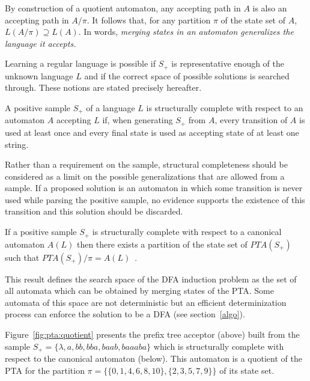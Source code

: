 By construction of a quotient automaton, any accepting path in $A$ is also an accepting path in $A/\pi$. It follows that, for any partition $\pi$ of the state set of $A$, $L(A/\pi) \supseteq L(A)$. In words, \textsl{merging states in an automaton generalizes the language it accepts.}
 
Learning a regular language is possible if $S_+$ is representative enough of the unknown language $L$ and if the correct space of possible solutions is searched through. These notions are stated precisely hereafter.

\begin{definition} A positive sample $S_+$ of a language $L$ is structurally complete with respect to an automaton $A$ accepting $L$ if, when generating $S_+$ from $A$, every transition of $A$ is used at least once and every final state is used as accepting state of at least one string.
\label{structural:completeness}
\end{definition}

Rather than a requirement on the sample, structural completeness should be considered as a limit on the possible generalizations that are allowed from a sample. If a proposed solution is an automaton in which some transition is never used while parsing the positive sample, no evidence supports the existence of this transition and this solution should be discarded. 

\begin{theorem}
\label{search:theo}
If a positive sample $S_+$ is structurally complete with respect to a canonical automaton $A(L)$ then there exists a partition of the state set of $PTA(S_+)$ such that $PTA(S_+)/\pi = A(L)$~\cite{Dupont:1994}.
\end{theorem} 

This result defines the search space of the DFA induction problem as the set of all automata which can be obtained by merging states of the PTA. Some automata of this space are not deterministic but an efficient determinization process can enforce the solution to be a DFA (see section~\ref{algo}).

Figure~\ref{fig:pta:quotient} presents the prefix tree acceptor (above) built from the sample 
$S_+ = \{\lambda,a,bb,bba,baab,baaaba\}$ which is structurally complete with respect to the canonical automaton (below).
This automaton is a quotient of the PTA for the partition $\pi=\{\{0,1,4,6,8,10\},\{2,3,5,7,9\}\}$ of its state set.

